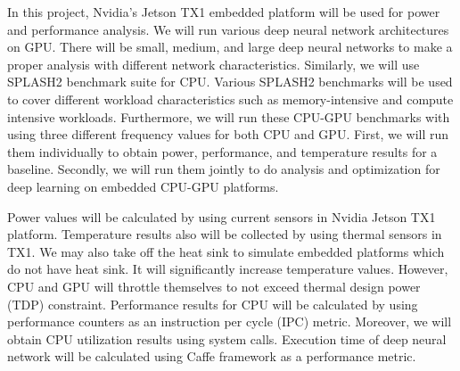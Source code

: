 In this project, Nvidia's Jetson TX1 embedded platform will be used for power and performance analysis. We will run various deep neural network architectures on GPU. There will be small, medium, and large deep neural networks to make a proper analysis with different network characteristics. Similarly, we will use SPLASH2 benchmark suite \cite{woo1995splash} for CPU. Various SPLASH2 benchmarks will be used to cover different workload characteristics such as memory-intensive and compute intensive workloads. Furthermore, we will run these CPU-GPU benchmarks with using three different frequency values for both CPU and GPU. First, we will run them individually to obtain power, performance, and temperature results for a baseline. Secondly, we will run them jointly to do analysis and optimization for deep learning on embedded CPU-GPU platforms.

Power values will be calculated by using current sensors in Nvidia Jetson TX1 platform. Temperature results also will be collected by using thermal sensors in TX1. We may also take off the heat sink to simulate embedded platforms which do not have heat sink. It will significantly increase temperature values. However, CPU and GPU will throttle themselves to not exceed thermal design power (TDP) constraint. Performance results for CPU will be calculated by using performance counters as an instruction per cycle (IPC) metric. Moreover, we will obtain CPU utilization results using system calls. Execution time of deep neural network will be calculated using Caffe framework \cite{caffe} as a performance metric. 
